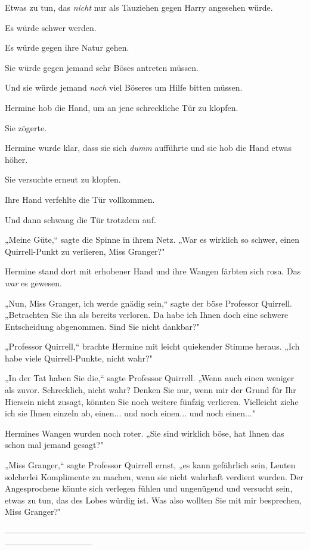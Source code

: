 {Etwas zu tun, das \emph{nicht} nur als Tauziehen gegen Harry angesehen würde.

Es würde schwer werden.

Es würde gegen ihre Natur gehen.

Sie würde gegen jemand sehr Böses antreten müssen.

Und sie würde jemand \emph{noch} viel Böseres um Hilfe bitten müssen.

Hermine hob die Hand, um an jene schreckliche Tür zu klopfen.

Sie zögerte.

Hermine wurde klar, dass sie sich \emph{dumm} aufführte und sie hob die Hand etwas höher.

Sie versuchte erneut zu klopfen.

Ihre Hand verfehlte die Tür vollkommen.

Und dann schwang die Tür trotzdem auf.

„Meine Güte,“ sagte die Spinne in ihrem Netz. „War es wirklich so schwer, einen Quirrell-Punkt zu verlieren, Miss Granger?"

Hermine stand dort mit erhobener Hand und ihre Wangen färbten sich rosa. Das \emph{war} es gewesen.

„Nun, Miss Granger, ich werde gnädig sein,“ sagte der böse Professor Quirrell. „Betrachten Sie ihn als bereits verloren. Da habe ich Ihnen doch eine schwere Entscheidung abgenommen. Sind Sie nicht dankbar?"

„Professor Quirrell,“ brachte Hermine mit leicht quiekender Stimme heraus. „Ich habe viele Quirrell-Punkte, nicht wahr?"

„In der Tat haben Sie die,“ sagte Professor Quirrell. „Wenn auch einen weniger als zuvor. Schrecklich, nicht wahr? Denken Sie nur, wenn mir der Grund für Ihr Hiersein nicht zusagt, könnten Sie noch weitere fünfzig verlieren. Vielleicht ziehe ich sie Ihnen einzeln ab, einen... und noch einen... und noch einen..."

Hermines Wangen wurden noch roter. „Sie sind wirklich böse, hat Ihnen das schon mal jemand gesagt?"

„Miss Granger,“ sagte Professor Quirrell ernst, „es kann gefährlich sein, Leuten solcherlei Komplimente zu machen, wenn sie nicht wahrhaft verdient wurden. Der Angesprochene könnte sich verlegen fühlen und ungenügend und versucht sein, etwas zu tun, das des Lobes würdig ist. Was also wollten Sie mit mir besprechen, Miss Granger?"

--------------------------------------------------------------------------------------------------------------------------------------------

}
